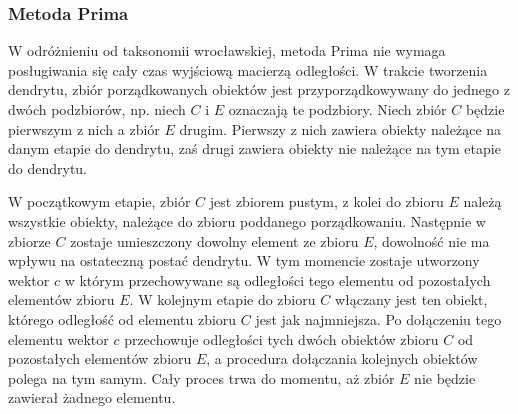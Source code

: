 \documentclass[12pt,a4paper]{report}
\begin{document}


\subsubsection{Metoda Prima}


W odróżnieniu od taksonomii wrocławskiej, metoda Prima nie wymaga posługiwania się cały czas wyjściową macierzą odległości. W trakcie tworzenia dendrytu, zbiór porządkowanych obiektów jest przyporządkowywany do jednego z dwóch podzbiorów, np. niech $C$ i $E$ oznaczają te podzbiory. Niech zbiór $C$ będzie pierwszym z nich a zbiór $E$ drugim. Pierwszy z nich zawiera obiekty należące na danym etapie do dendrytu, zaś drugi zawiera obiekty nie należące na tym etapie do dendrytu.

W początkowym etapie, zbiór $C$ jest zbiorem pustym, z kolei do zbioru $E$ należą wszystkie obiekty, należące do zbioru poddanego porządkowaniu. Następnie w zbiorze $C$ zostaje umieszczony dowolny element ze zbioru $E$, dowolność nie ma wpływu na ostateczną postać dendrytu. W tym momencie zostaje utworzony wektor $c$ w którym przechowywane są odległości tego elementu od pozostałych elementów zbioru $E$. W kolejnym etapie do zbioru $C$ włączany jest ten obiekt, którego odległość od elementu  zbioru $C$ jest jak najmniejsza. Po dołączeniu tego elementu wektor $c$ przechowuje odległości tych dwóch obiektów zbioru $C$ od pozostałych elementów zbioru $E$, a procedura dołączania kolejnych obiektów polega na tym samym. Cały proces trwa do momentu, aż zbiór $E$ nie będzie zawierał żadnego elementu. 
\end{document}
